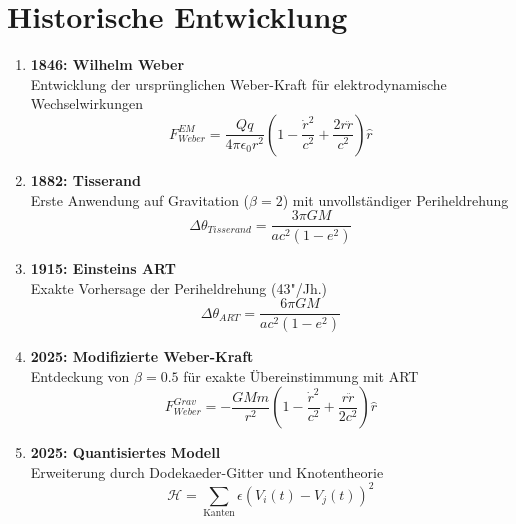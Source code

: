 \documentclass{article}
\begin{document}
\section{Historische Entwicklung}
\begin{enumerate}
    \item \textbf{1846: Wilhelm Weber} \\
    Entwicklung der ursprünglichen Weber-Kraft für elektrodynamische Wechselwirkungen
    \[ F_{Weber}^{EM} = \frac{Qq}{4\pi\epsilon_0 r^2}\left(1 - \frac{\dot{r}^2}{c^2} + \frac{2r\ddot{r}}{c^2}\right)\hat{r} \]
    
    \item \textbf{1882: Tisserand} \\
    Erste Anwendung auf Gravitation ($\beta=2$) mit unvollständiger Periheldrehung
    \[ \Delta\theta_{Tisserand} = \frac{3\pi GM}{a c^2 (1-e^2)} \]
    
    \item \textbf{1915: Einsteins ART} \\
    Exakte Vorhersage der Periheldrehung (43"/Jh.)
    \[ \Delta\theta_{ART} = \frac{6\pi GM}{a c^2 (1-e^2)} \]
    
    \item \textbf{2025: Modifizierte Weber-Kraft} \\
    Entdeckung von $\beta=0.5$ für exakte Übereinstimmung mit ART
    \[ F_{Weber}^{Grav} = -\frac{GMm}{r^2}\left(1 - \frac{\dot{r}^2}{c^2} + \frac{r\ddot{r}}{2c^2}\right)\hat{r} \]
    
    \item \textbf{2025: Quantisiertes Modell} \\
    Erweiterung durch Dodekaeder-Gitter und Knotentheorie
    \[ \mathcal{H} = \sum_{\text{Kanten}} \epsilon (V_i(t) - V_j(t))^2 \]
\end{enumerate}

\begin{center}
\end{center}
\end{document}
